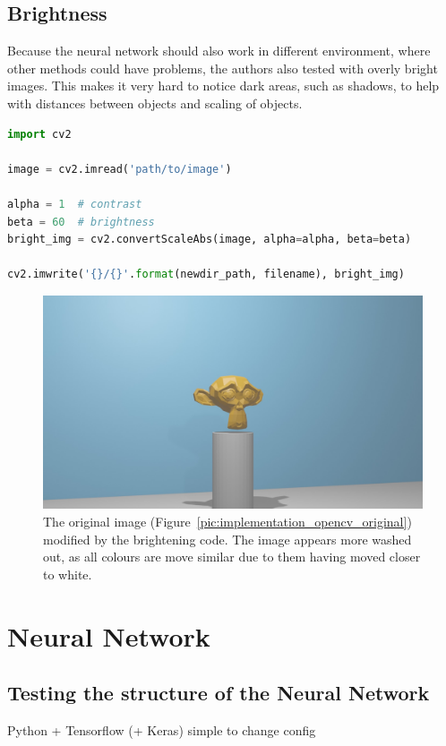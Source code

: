\subsection{Brightness}
Because the neural network should also work in different environment, where other methods could have problems, the authors also tested with overly bright images. This makes it very hard to notice dark areas, such as shadows, to help with distances between objects and scaling of objects.

\begin{lstlisting}[language=python]
import cv2

image = cv2.imread('path/to/image')

alpha = 1  # contrast
beta = 60  # brightness
bright_img = cv2.convertScaleAbs(image, alpha=alpha, beta=beta)

cv2.imwrite('{}/{}'.format(newdir_path, filename), bright_img)
\end{lstlisting}

\begin{figure}[h!]
	\centering
	\includegraphics[width=4.5in]{img/implementation_opencv_brightness.jpg}
	\caption{The original image (Figure~\ref{pic:implementation_opencv_original}) modified by the brightening code. The image appears more washed out, as all colours are move similar due to them having moved closer to white.}
	\label{pic:implementation_opencv_brightness}
\end{figure}

\section{Neural Network}
\subsection{Testing the structure of the Neural Network}
Python + Tensorflow (+ Keras) simple to change config

